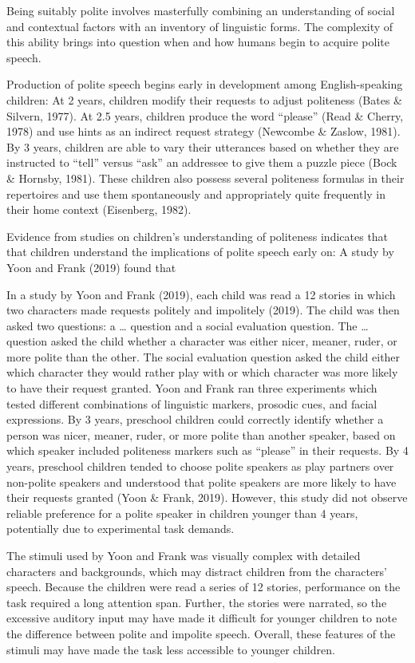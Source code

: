 \documentclass[
  english,
  man,floatsintext]{apa6}
\begin{document}
Being suitably polite involves masterfully combining an understanding of social and contextual factors with an inventory of linguistic forms. The complexity of this ability brings into question when and how humans begin to acquire polite speech.

Production of polite speech begins early in development among English-speaking children: At 2 years, children modify their requests to adjust politeness (Bates \& Silvern, 1977). At 2.5 years, children produce the word ``please'' (Read \& Cherry, 1978) and use hints as an indirect request strategy (Newcombe \& Zaslow, 1981). By 3 years, children are able to vary their utterances based on whether they are instructed to ``tell'' versus ``ask'' an addressee to give them a puzzle piece (Bock \& Hornsby, 1981). These children also possess several politeness formulas in their repertoires and use them spontaneously and appropriately quite frequently in their home context (Eisenberg, 1982).

Evidence from studies on children's understanding of politeness indicates that that children understand the implications of polite speech early on: A study by Yoon and Frank (2019) found that

In a study by Yoon and Frank (2019), each child was read a 12 stories in which two characters made requests politely and impolitely (2019). The child was then asked two questions: a \ldots{} question and a social evaluation question. The \ldots{} question asked the child whether a character was either nicer, meaner, ruder, or more polite than the other. The social evaluation question asked the child either which character they would rather play with or which character was more likely to have their request granted. Yoon and Frank ran three experiments which tested different combinations of linguistic markers, prosodic cues, and facial expressions. By 3 years, preschool children could correctly identify whether a person was nicer, meaner, ruder, or more polite than another speaker, based on which speaker included politeness markers such as ``please'' in their requests. By 4 years, preschool children tended to choose polite speakers as play partners over non-polite speakers and understood that polite speakers are more likely to have their requests granted (Yoon \& Frank, 2019). However, this study did not observe reliable preference for a polite speaker in children younger than 4 years, potentially due to experimental task demands.

The stimuli used by Yoon and Frank was visually complex with detailed characters and backgrounds, which may distract children from the characters' speech. Because the children were read a series of 12 stories, performance on the task required a long attention span. Further, the stories were narrated, so the excessive auditory input may have made it difficult for younger children to note the difference between polite and impolite speech. Overall, these features of the stimuli may have made the task less accessible to younger children.
\end{document}
